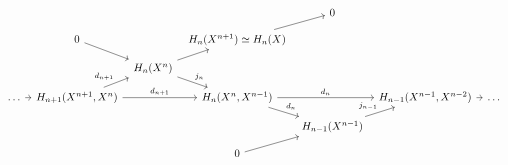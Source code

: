 \documentclass[a4paper,11pt]{article}
\begin{document}
			






\newpage
\phantom{hallo}
\newpage

				\begin{equation*}
					\begin{tikzcd}[row sep=small, column sep=tiny]
						& & & & 0 & & \\
						& 0\ar[dr] & & H_n(X^{n+1})\simeq H_n(X)\ar[ur] & & & \\
						& & H_n(X^n)\ar[ur]\ar[dr,"j_n"] & & & & \\
						\dots\ar[r] & H_{n+1}(X^{n+1},X^n)\ar[ur,"d_{n+1}"]\ar[rr,"d_{n+1}"] & & H_n(X^n,X^{n-1})\ar[dr,"d_n"]\ar[rr,"d_n"] & & H_{n-1}(X^{n-1},X^{n-2})\ar[r] & \dots\\
						& & & & H_{n-1}(X^{n-1})\ar[ur,"j_{n-1}"] & & \\
						& & & 0\ar[ur] & & &
					\end{tikzcd}
				\end{equation*}
\end{document}
